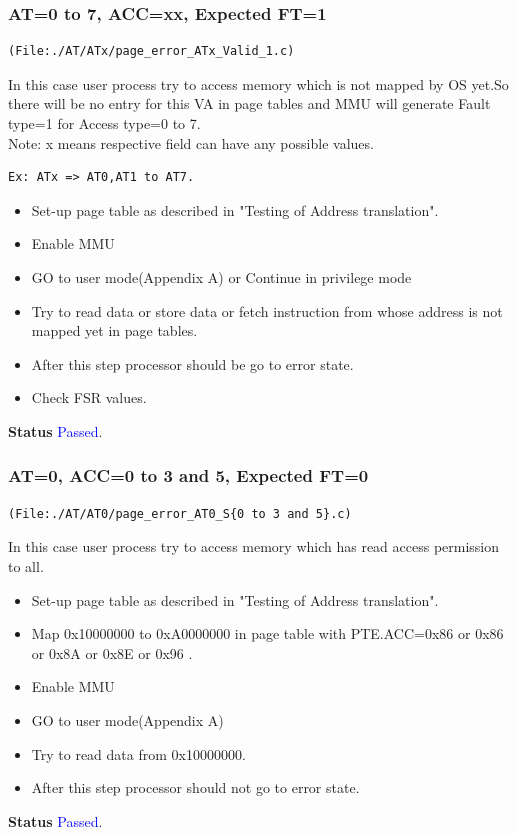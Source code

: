 \documentclass[12pt,a4paper]{article}
\begin{document}
\subsubsection{ AT=0 to 7, ACC=xx, Expected FT=1}
\begin{lstlisting}
(File:./AT/ATx/page_error_ATx_Valid_1.c)
\end{lstlisting}
In this case user process try to access memory which is not mapped by OS yet.So there will be no entry for this VA in page tables and MMU will generate Fault type=1 for Access type=0 to 7.\\
Note: x means respective field can have any possible values. 
\begin{lstlisting} 
Ex: ATx => AT0,AT1 to AT7.
\end{lstlisting} 
\begin{itemize}
\item Set-up page table as described in "Testing of Address translation".
\item Enable MMU
\item GO to user mode(Appendix A) or Continue in privilege mode
\item Try to read data or store data or fetch instruction from whose address is not mapped yet in page tables.
\item After this step processor should be go to error state.
\item Check FSR values.
\end{itemize}
\textbf{Status} \textcolor{blue}{Passed}.
\subsubsection{ AT=0, ACC=0 to 3 and 5, Expected FT=0}
\begin{lstlisting}
(File:./AT/AT0/page_error_AT0_S{0 to 3 and 5}.c)
\end{lstlisting}
In this case user process try to access memory which has read access permission to all.

\begin{itemize}
\item Set-up page table as described in "Testing of Address translation".
\item Map 0x10000000 to 0xA0000000 in page table with PTE.ACC=0x86 or 0x86 or 0x8A or 0x8E  or 0x96 .
\item Enable MMU
\item GO to user mode(Appendix A) 
\item Try to read data from 0x10000000.
\item After this step processor should not go to error state.  
\end{itemize}
\textbf{Status} \textcolor{blue}{Passed}.
\end{document}
